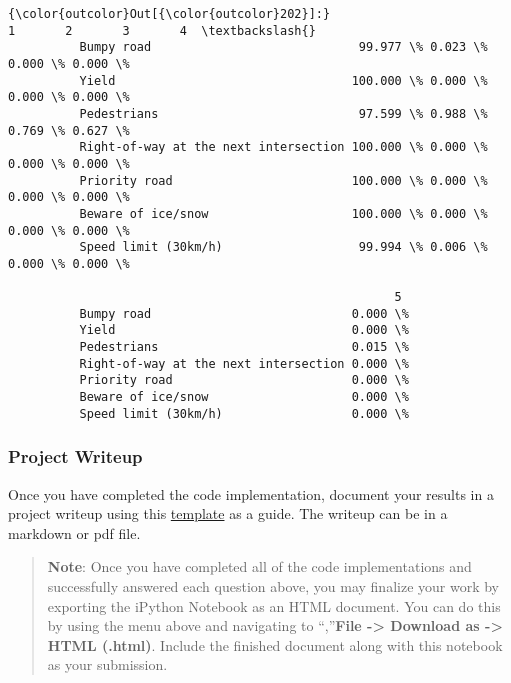 \documentclass[11pt]{article}
\begin{document}
\begin{Verbatim}[commandchars=\\\{\}]
{\color{outcolor}Out[{\color{outcolor}202}]:}                                               1       2       3       4  \textbackslash{}
          Bumpy road                             99.977 \% 0.023 \% 0.000 \% 0.000 \%   
          Yield                                 100.000 \% 0.000 \% 0.000 \% 0.000 \%   
          Pedestrians                            97.599 \% 0.988 \% 0.769 \% 0.627 \%   
          Right-of-way at the next intersection 100.000 \% 0.000 \% 0.000 \% 0.000 \%   
          Priority road                         100.000 \% 0.000 \% 0.000 \% 0.000 \%   
          Beware of ice/snow                    100.000 \% 0.000 \% 0.000 \% 0.000 \%   
          Speed limit (30km/h)                   99.994 \% 0.006 \% 0.000 \% 0.000 \%   
          
                                                      5  
          Bumpy road                            0.000 \%  
          Yield                                 0.000 \%  
          Pedestrians                           0.015 \%  
          Right-of-way at the next intersection 0.000 \%  
          Priority road                         0.000 \%  
          Beware of ice/snow                    0.000 \%  
          Speed limit (30km/h)                  0.000 \%  
\end{Verbatim}
            
    \hypertarget{project-writeup}{%
\subsubsection{Project Writeup}\label{project-writeup}}

Once you have completed the code implementation, document your results
in a project writeup using this
\href{https://github.com/udacity/CarND-Traffic-Sign-Classifier-Project/blob/master/writeup_template.md}{template}
as a guide. The writeup can be in a markdown or pdf file.

    \begin{quote}
\textbf{Note}: Once you have completed all of the code implementations
and successfully answered each question above, you may finalize your
work by exporting the iPython Notebook as an HTML document. You can do
this by using the menu above and navigating to \n``,''\textbf{File
-\textgreater{} Download as -\textgreater{} HTML (.html)}. Include the
finished document along with this notebook as your submission.
\end{quote}
\end{document}
